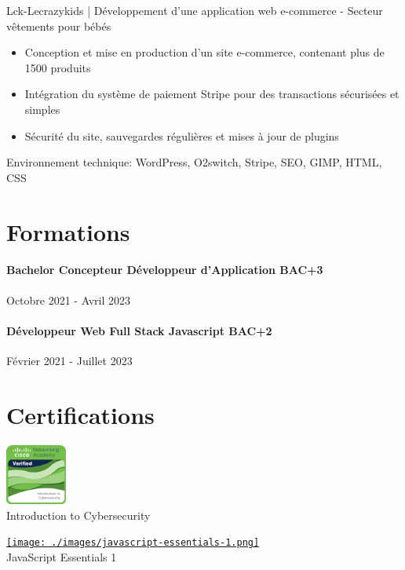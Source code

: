 \documentclass{article}
\begin{document}
\noindent
Lck-Lecrazykids | Développement d’une application web e-commerce - Secteur vêtements pour bébés

\raggedright  
\begin{itemize}
  \item{Conception et mise en production d'un site e-commerce, contenant plus de 1500 produits}
\item{Intégration du système de paiement Stripe pour des transactions sécurisées et simples}
\item{Sécurité du site, sauvegardes régulières et mises à jour de plugins}
\end{itemize}
\noindent
Environnement technique: WordPress, O2switch, Stripe, SEO, GIMP, HTML, CSS

\vspace{1ex}
\hrulefill
\section*{Formations}
\paragraph{Bachelor Concepteur Développeur d’Application BAC+3}\hspace*{\fill}Octobre 2021 - Avril 2023
\paragraph{Développeur Web Full Stack Javascript BAC+2}\hspace*{\fill}Février 2021 - Juillet 2023

\vspace{1ex}
\hrulefill
\section*{Certifications}

\noindent
\begin{minipage}[t]{0.45\textwidth}
    \centering
    \href{https://www.credly.com/badges/6cc7444d-a897-46e0-880c-aae24bd23910}{\includegraphics[width=0.15\textwidth]{./images/introduction-to-cybersecurity.png}}
    \\
    Introduction to Cybersecurity
\end{minipage}
\hfill
\begin{minipage}[t]{0.45\textwidth}
    \centering
    \href{https://www.credly.com/badges/47bf9849-07c5-4995-a7fc-6826700dff6e/public_url}{\texttt{[image: ./images/javascript-essentials-1.png]}}
    \\
    JavaScript Essentials 1
\end{minipage}
\end{document}
